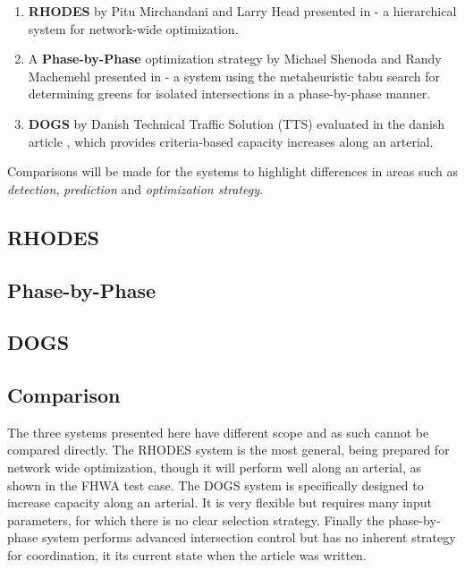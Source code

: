 \begin{enumerate}
\item \textbf{RHODES} by Pitu Mirchandani and Larry Head presented in
\cite{44} - a hierarchical system for network-wide optimization.

\item A \textbf{Phase-by-Phase} optimization strategy by Michael
Shenoda and Randy Machemehl presented in \cite{1} - a system using the
metaheuristic tabu search for determining greens for isolated
intersections in a phase-by-phase manner.

\item \textbf{DOGS} by Danish Technical Traffic Solution (TTS)
evaluated in the danish article \cite{dogs}, which provides
criteria-based capacity increases along an arterial.

\end{enumerate}

Comparisons will be made for the systems to highlight differences in
areas such as \textit{detection}, \textit{prediction} and
\textit{optimization strategy}.

\subsection{RHODES}


\subsection{Phase-by-Phase}


\subsection{DOGS}


\subsection{Comparison}

The three systems presented here have different scope and as such
cannot be compared directly. The RHODES system is the most general,
being prepared for network wide optimization, though it will perform
well along an arterial, as shown in the FHWA test case. The DOGS
system is specifically designed to increase capacity along an
arterial. It is very flexible but requires many input parameters, for
which there is no clear selection strategy. Finally the phase-by-phase
system performs advanced intersection control but has no inherent
strategy for coordination, it its current state when the article was
written.

